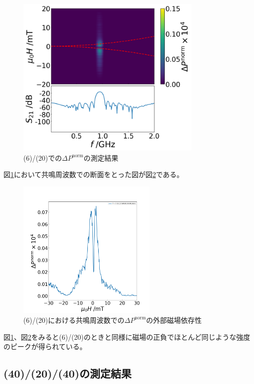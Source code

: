 \documentclass[dvipdfmx,11pt]{jsreport}
\numberwithin{equation}{chapter}
\numberwithin{table}{chapter}
\begin{document}
\begin{figure}[H]
	\centering
	\includegraphics[width=0.80\textwidth]{figdata/mnpyp.png}
	\caption{(6)/(20)での$\Delta P^{\text{norm}}$の測定結果}
	\label{fig:mnpyp}
\end{figure}
図\ref{fig:mnpyp}において共鳴周波数での断面をとった図が図\ref{fig:mnpyd}である。
\begin{figure}[H]
	\centering
	\includegraphics[width=0.6\textwidth]{figdata/mnpy17-1danmen.png}
	\caption{\normalsize{(6)/(20)における共鳴周波数での$\Delta P^{\text{norm}}$の外部磁場依存性}}
	\label{fig:mnpyd}
\end{figure}
図\ref{fig:mnpyp}、図\ref{fig:mnpyd}をみると(6)/(20)のときと同様に磁場の正負でほとんど同じような強度のピークが得られている。

\subsection{(40)/(20)/(40)の測定結果}
\end{document}
